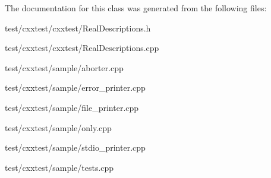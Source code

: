 The documentation for this class was generated from the following files\-:\begin{DoxyCompactItemize}
\item 
test/cxxtest/cxxtest/Real\-Descriptions.\-h\item 
test/cxxtest/cxxtest/Real\-Descriptions.\-cpp\item 
test/cxxtest/sample/aborter.\-cpp\item 
test/cxxtest/sample/error\-\_\-printer.\-cpp\item 
test/cxxtest/sample/file\-\_\-printer.\-cpp\item 
test/cxxtest/sample/only.\-cpp\item 
test/cxxtest/sample/stdio\-\_\-printer.\-cpp\item 
test/cxxtest/sample/tests.\-cpp\end{DoxyCompactItemize}
